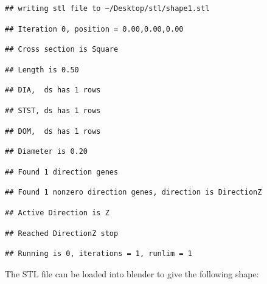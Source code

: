 \documentclass[]{article}
\begin{document}
\begin{verbatim}
## writing stl file to ~/Desktop/stl/shape1.stl
\end{verbatim}

\begin{verbatim}
## Iteration 0, position = 0.00,0.00,0.00
\end{verbatim}

\begin{verbatim}
## Cross section is Square
\end{verbatim}

\begin{verbatim}
## Length is 0.50
\end{verbatim}

\begin{verbatim}
## DIA,  ds has 1 rows
\end{verbatim}

\begin{verbatim}
## STST, ds has 1 rows
\end{verbatim}

\begin{verbatim}
## DOM,  ds has 1 rows
\end{verbatim}

\begin{verbatim}
## Diameter is 0.20
\end{verbatim}

\begin{verbatim}
## Found 1 direction genes
\end{verbatim}

\begin{verbatim}
## Found 1 nonzero direction genes, direction is DirectionZ
\end{verbatim}

\begin{verbatim}
## Active Direction is Z
\end{verbatim}

\begin{verbatim}
## Reached DirectionZ stop
\end{verbatim}

\begin{verbatim}
## Running is 0, iterations = 1, runlim = 1
\end{verbatim}

The STL file can be loaded into blender to give the following shape:
\end{document}
